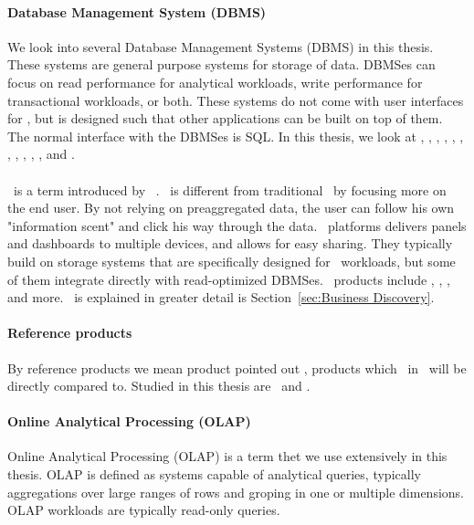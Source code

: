 \paragraph{Database Management System (DBMS)}
\label{par:Database Management System (DBMS)}
We look into several Database Management Systems (DBMS) in this thesis. These systems are general purpose systems for storage of data. DBMSes can focus on read performance for analytical workloads, write performance for transactional workloads, or both. These systems do not come with user interfaces for \bd, but is designed such that other applications can be built on top of them. The normal interface with the DBMSes is SQL. In this thesis, we look at \oracle, \ibm, \saph, \sapnw, \mssql, \cstore, \vertica, \blink, \exasol, \oracle, \hyper, and \hyrise.

\paragraph{\bd}
\label{par:Business Discovery}
\bd~is a term introduced by \qlikview~\cite{Qlik2014-vd}. \bd~is different from traditional \bi~by focusing more on the end user. By not relying on preaggregated data, the user can follow his own "information scent" and click his way through the data. \bd~platforms delivers panels and dashboards to multiple devices, and allows for easy sharing. They typically build on storage systems that are specifically designed for \bd~workloads, but some of them integrate directly with read-optimized DBMSes. \bd~products include \tableau, \qlikview, \powerpivot, and more. \bd~is explained in greater detail is Section~\ref{sec:Business Discovery}.

\paragraph{Reference products}
\label{par:Reference products}
By reference products we mean product pointed out \genus, products which \bd~in \genusSoftware~will be directly compared to. Studied in this thesis are \qlikview~and \tableau.

\paragraph{Online Analytical Processing (OLAP)}
\label{par:Online Analytical Processing (OLAP)}
Online Analytical Processing (OLAP) is a term thet we use extensively in this thesis. OLAP is defined as systems capable of analytical queries, typically aggregations over large ranges of rows and groping in one or multiple dimensions. OLAP workloads are typically read-only queries.
